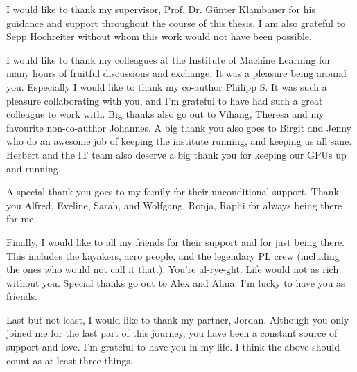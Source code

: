 %

I would like to thank my supervisor, Prof. Dr. Günter Klambauer for his guidance
and support throughout the course of this thesis. I am also grateful to Sepp Hochreiter 
without whom this work would not have been possible. 

I would like to thank my colleagues at the Institute of Machine Learning for
many hours of fruitful discussions and exchange. It was a pleasure being around
you. Especially I would like to thank my co-author Philipp S. It was such a
pleasure collaborating with you, and I'm grateful to have had such a great
colleague to work with. Big thanks also go out to Vihang, Theresa and my
favourite non-co-author Johannes. A big thank you also goes to Birgit and Jenny
who do an awesome job of keeping the institute running, and keeping us all sane.
Herbert and the IT team also deserve a big thank you for keeping our GPUs up and
running.

A special thank you goes to my family for their unconditional support. Thank you 
Alfred, Eveline, Sarah, and Wolfgang, Ronja, Raphi for always being there for me. 

Finally, I would like to all my friends for their support and for just being
there. This includes the kayakers, acro people, and the legendary PL crew
(including the ones who would not call it that.). You're al-rye-ght. Life would
not as rich without you. Special thanks go out to Alex and Alina. I'm lucky to
have you as friends. 

Last but not least, I would like to thank my partner, Jordan. Although you only 
joined me for the last part of this journey, you have been a constant source of
support and love. I'm grateful to have you in my life. I think the above should 
count as at least three things.

